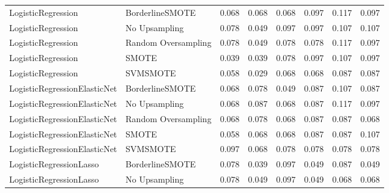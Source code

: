 \begin{tabular}{llllllll}
          LogisticRegression &     BorderlineSMOTE & 0.068 &                     0.068 &                 0.068 &                  0.097 &                                   0.117 &    0.097 \\
          LogisticRegression &       No Upsampling & 0.078 &                     0.049 &                 0.097 &                  0.097 &                                   0.107 &    0.107 \\
          LogisticRegression & Random Oversampling & 0.078 &                     0.049 &                 0.078 &                  0.078 &                                   0.117 &    0.097 \\
          LogisticRegression &               SMOTE & 0.039 &                     0.039 &                 0.078 &                  0.097 &                                   0.107 &    0.097 \\
          LogisticRegression &            SVMSMOTE & 0.058 &                     0.029 &                 0.068 &                  0.068 &                                   0.087 &    0.087 \\
LogisticRegressionElasticNet &     BorderlineSMOTE & 0.068 &                     0.078 &                 0.049 &                  0.087 &                                   0.107 &    0.087 \\
LogisticRegressionElasticNet &       No Upsampling & 0.068 &                     0.087 &                 0.068 &                  0.087 &                                   0.117 &    0.097 \\
LogisticRegressionElasticNet & Random Oversampling & 0.068 &                     0.078 &                 0.068 &                  0.087 &                                   0.087 &    0.068 \\
LogisticRegressionElasticNet &               SMOTE & 0.058 &                     0.068 &                 0.068 &                  0.087 &                                   0.087 &    0.107 \\
LogisticRegressionElasticNet &            SVMSMOTE & 0.097 &                     0.068 &                 0.078 &                  0.078 &                                   0.078 &    0.078 \\
     LogisticRegressionLasso &     BorderlineSMOTE & 0.078 &                     0.039 &                 0.097 &                  0.049 &                                   0.087 &    0.049 \\
     LogisticRegressionLasso &       No Upsampling & 0.078 &                     0.049 &                 0.097 &                  0.049 &                                   0.068 &    0.068 \\

\end{tabular}
